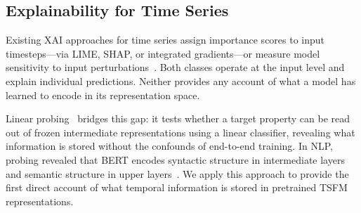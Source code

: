 \subsection{Explainability for Time Series}
\label{sec:rel_xai}

Existing XAI approaches for time series assign importance scores to input
timesteps---via LIME, SHAP, or integrated gradients---or measure model
sensitivity to input perturbations~\cite{ismail2020benchmarking,
theissler2022explainable}.
Both classes operate at the input level and explain individual predictions.
Neither provides any account of what a model has learned to encode in its
representation space.

Linear probing~\cite{alain2017probing} bridges this gap: it tests whether a
target property can be read out of frozen intermediate representations using
a linear classifier, revealing what information is stored without the
confounds of end-to-end training.
In NLP, probing revealed that BERT encodes syntactic structure in intermediate
layers and semantic structure in upper layers~\cite{reif2019visualizing}.
We apply this approach to provide the first direct account of what temporal
information is stored in pretrained TSFM representations.
